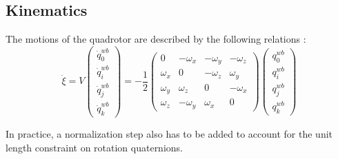     \subsection{Kinematics}
        The motions of the quadrotor are described by the following relations \citep{Pounds_modellingand}: %
        \begin{subequations}
            \label{eq:observer:kinematicsc}
            \begin{equation}
                \label{eq:observer:position}
                \dot{\xi} = V
            \end{equation}
            \begin{equation}
                \label{eq:observer:quaternionsc}
                \left(\begin{array}{c}
                    \dot{q}^{wb}_{0} \\
                    \dot{q}^{wb}_{i} \\
                    \dot{q}^{wb}_{j} \\
                    \dot{q}^{wb}_{k}
                \end{array}\right) = -\frac{1}{2}\left(\begin{array}{cccc}
                0 & -\omega_{x} & -\omega_{y} & -\omega_{z} \\
                \omega_{x} & 0 & -\omega_{z} & \omega_{y} \\
                \omega_{y} & \omega_{z} & 0 & -\omega_{x} \\
                \omega_{z} & -\omega_{y} & \omega_{x} & 0
                \end{array}\right)\left(\begin{array}{c}
                q^{wb}_{0} \\
                q^{wb}_{i} \\
                q^{wb}_{j} \\
                q^{wb}_{k}
                \end{array}\right)
            \end{equation}
        \end{subequations}

        In practice, a normalization step also has to be added to account for
        the unit length constraint on rotation quaternions.


